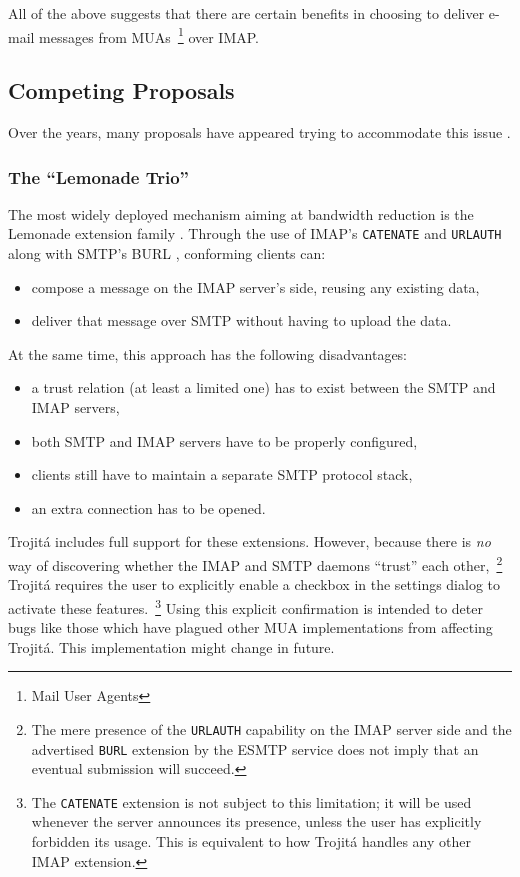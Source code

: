 \documentclass[trojita]{subfiles}
\begin{document}
All of the above suggests that there are certain benefits in choosing to deliver e-mail messages from
MUAs~\footnote{Mail User Agents} over IMAP.

\subsection{Competing Proposals}

Over the years, many proposals have appeared trying to accommodate this issue \cite{draft-ietf-lemonade-submit}.

\subsubsection{The ``Lemonade Trio''}

The most widely deployed mechanism aiming at bandwidth reduction is the Lemonade extension family \cite{rfc5550}.
Through the use of IMAP's {\tt CATENATE} \cite{rfc4469} and {\tt URLAUTH} \cite{rfc4467} along with SMTP's BURL
\cite{rfc4468}, conforming clients can:

\begin{itemize}
  \item compose a message on the IMAP server's side, reusing any existing data,
  \item deliver that message over SMTP without having to upload the data.
\end{itemize}

At the same time, this approach has the following disadvantages:

\begin{itemize}
  \item a trust relation (at least a limited one) has to exist between the SMTP and IMAP servers,
  \item both SMTP and IMAP servers have to be properly configured,
  \item clients still have to maintain a separate SMTP protocol stack,
  \item an extra connection has to be opened.
\end{itemize}

Trojitá includes full support for these extensions.  However, because there is {\em no} way of discovering whether the
IMAP and SMTP daemons ``trust'' each other,~\footnote{The mere presence of the {\tt URLAUTH} capability on the IMAP
server side and the advertised {\tt BURL} extension by the ESMTP service does not imply that an eventual submission will
succeed.} Trojitá requires the user to explicitly enable a checkbox in the settings dialog to activate these
features.~\footnote{The {\tt CATENATE} extension is not subject to this limitation; it will be used whenever the server
announces its presence, unless the user has explicitly forbidden its usage.  This is equivalent to how Trojitá handles
any other IMAP extension.}  Using this explicit confirmation is intended to deter bugs like those which have plagued
other MUA implementations \cite{qmf-fastmail-burl-bug} from affecting Trojitá.  This implementation might change in
future.
\end{document}
